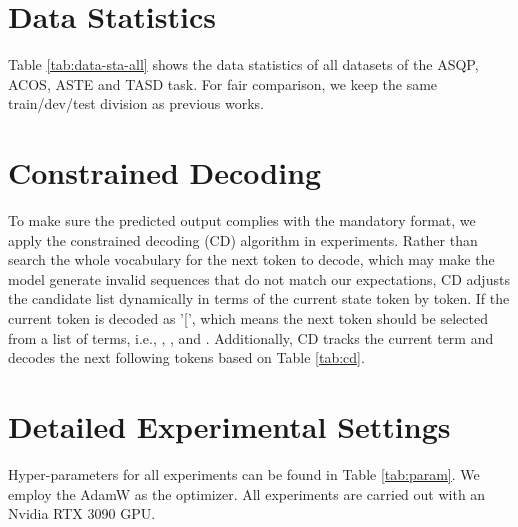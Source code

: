 \documentclass[11pt]{article}
\begin{document}



\newpage
\appendix

\section{Data Statistics}
\label{sec:appendix:data}


Table \ref{tab:data-sta-all} shows the data statistics of all datasets of the ASQP, ACOS, ASTE and TASD task. For fair comparison, we keep the same train/dev/test division as previous works. 



\section{Constrained Decoding}
\label{sec:appendix:cd}
To make sure the predicted output complies with the mandatory format, we apply the constrained decoding (CD) algorithm in experiments. Rather than search the whole vocabulary for the next token to decode, which may make the model generate invalid sequences that do not match our expectations, CD adjusts the candidate list dynamically in terms of the current state token by token. If the current token is decoded as '[', which means the next token should be selected from a list of terms, i.e., , ,  and . Additionally, CD tracks the current term and decodes the next following tokens based on Table \ref{tab:cd}.

\begin{table}[h]
  \centering
\caption{Candidate lists of different terms}
\label{tab:cd}
\end{table} 

\section{Detailed Experimental Settings}
\label{sec:appendix:exps}
Hyper-parameters for all experiments can be found in Table \ref{tab:param}. 
We employ the AdamW \cite{DBLP:conf/iclr/LoshchilovH19} as the optimizer. All experiments are carried out with an Nvidia RTX 3090 GPU. 
\end{document}
